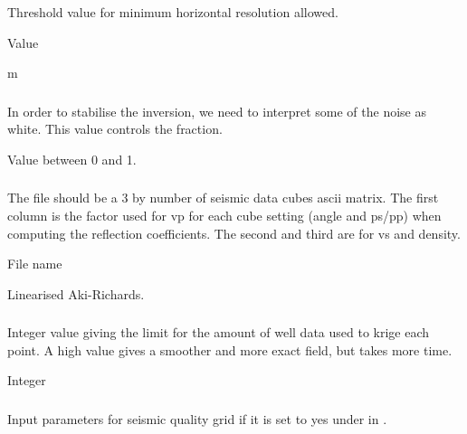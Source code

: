 \subsubsection{}
 \slist
   \item \Description Threshold value for minimum horizontal resolution allowed.
   \item \Argument Value
   \item {} m
 \elist

 \subsubsection{}
 \slist
   \item \Description In order to stabilise the inversion, we need to interpret some of the noise as white. This value controls the fraction.
   \item \Argument Value between 0 and 1.
   \item {}
 \elist

\subsubsection{}
\slist
   \item \Description The file should be a 3 by  number of seismic data cubes ascii matrix. The first column is the factor used for vp for each cube setting (angle and ps/pp) when computing the reflection coefficients. The second and third are for vs and density.
   \item \Argument File name
   \item \Default Linearised Aki-Richards.
 \elist

\subsubsection{}
 \slist
   \item \Description Integer value giving the limit for the amount of well data used to krige each point. A high value gives a smoother and more exact field, but takes more time.
   \item \Argument Integer
   \item {}
 \elist

\subsubsection{}
 \slist
   \item \Description Input parameters for seismic quality grid if it is set to yes under  in .
   \item \Argument 
   \item \Default 
 \elist 
 
